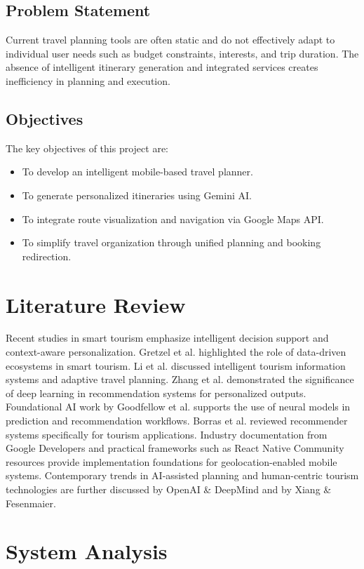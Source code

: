 \documentclass[12pt,a4paper]{article}
\begin{document}
\subsection{Problem Statement}
Current travel planning tools are often static and do not effectively adapt to individual user needs such as budget constraints, interests, and trip duration. The absence of intelligent itinerary generation and integrated services creates inefficiency in planning and execution.

\subsection{Objectives}
The key objectives of this project are:
\begin{itemize}
    \item To develop an intelligent mobile-based travel planner.
    \item To generate personalized itineraries using Gemini AI.
    \item To integrate route visualization and navigation via Google Maps API.
    \item To simplify travel organization through unified planning and booking redirection.
\end{itemize}

\section{Literature Review}
Recent studies in smart tourism emphasize intelligent decision support and context-aware personalization. Gretzel et al. highlighted the role of data-driven ecosystems in smart tourism. Li et al. discussed intelligent tourism information systems and adaptive travel planning. Zhang et al. demonstrated the significance of deep learning in recommendation systems for personalized outputs. Foundational AI work by Goodfellow et al. supports the use of neural models in prediction and recommendation workflows. Borras et al. reviewed recommender systems specifically for tourism applications. Industry documentation from Google Developers and practical frameworks such as React Native Community resources provide implementation foundations for geolocation-enabled mobile systems. Contemporary trends in AI-assisted planning and human-centric tourism technologies are further discussed by OpenAI \& DeepMind and by Xiang \& Fesenmaier.

\section{System Analysis}
\end{document}
